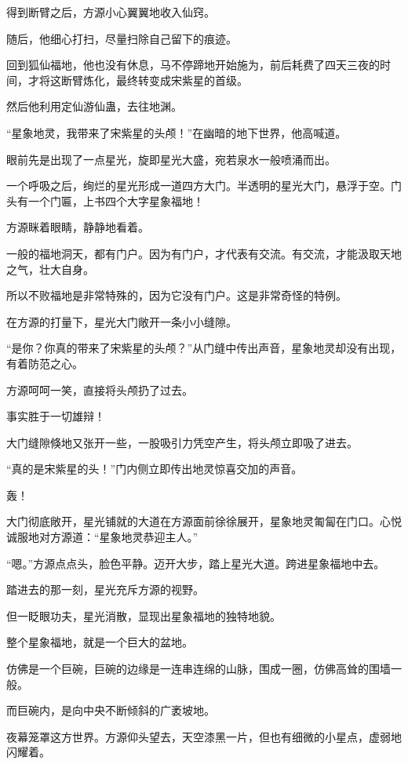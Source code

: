 
\begin{this_body}

得到断臂之后，方源小心翼翼地收入仙窍。

随后，他细心打扫，尽量扫除自己留下的痕迹。

回到狐仙福地，他也没有休息，马不停蹄地开始施为，前后耗费了四天三夜的时间，才将这断臂炼化，最终转变成宋紫星的首级。

然后他利用定仙游仙蛊，去往地渊。

“星象地灵，我带来了宋紫星的头颅！”在幽暗的地下世界，他高喊道。

眼前先是出现了一点星光，旋即星光大盛，宛若泉水一般喷涌而出。

一个呼吸之后，绚烂的星光形成一道四方大门。半透明的星光大门，悬浮于空。门头有一个门匾，上书四个大字星象福地！

方源眯着眼睛，静静地看着。

一般的福地洞天，都有门户。因为有门户，才代表有交流。有交流，才能汲取天地之气，壮大自身。

所以不败福地是非常特殊的，因为它没有门户。这是非常奇怪的特例。

在方源的打量下，星光大门敞开一条小小缝隙。

“是你？你真的带来了宋紫星的头颅？”从门缝中传出声音，星象地灵却没有出现，有着防范之心。

方源呵呵一笑，直接将头颅扔了过去。

事实胜于一切雄辩！

大门缝隙倏地又张开一些，一股吸引力凭空产生，将头颅立即吸了进去。

“真的是宋紫星的头！”门内侧立即传出地灵惊喜交加的声音。

轰！

大门彻底敞开，星光铺就的大道在方源面前徐徐展开，星象地灵匍匐在门口。心悦诚服地对方源道：“星象地灵恭迎主人。”

“嗯。”方源点点头，脸色平静。迈开大步，踏上星光大道。跨进星象福地中去。

踏进去的那一刻，星光充斥方源的视野。

但一眨眼功夫，星光消散，显现出星象福地的独特地貌。

整个星象福地，就是一个巨大的盆地。

仿佛是一个巨碗，巨碗的边缘是一连串连绵的山脉，围成一圈，仿佛高耸的围墙一般。

而巨碗内，是向中央不断倾斜的广袤坡地。

夜幕笼罩这方世界。方源仰头望去，天空漆黑一片，但也有细微的小星点，虚弱地闪耀着。


\end{this_body}
